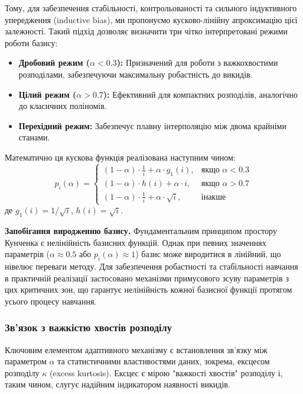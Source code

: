 \documentclass[12pt,a4paper]{article}
\begin{document}
Тому, для забезпечення стабільності, контрольованості та сильного індуктивного упередження (inductive bias), ми пропонуємо кусково-лінійну апроксимацію цієї залежності. Такий підхід дозволяє визначити три чітко інтерпретовані режими роботи базису:
\begin{itemize}
	\item \textbf{Дробовий режим ($\alpha < 0.3$):} Призначений для роботи з важкохвостими розподілами, забезпечуючи максимальну робастність до викидів.
	\item \textbf{Цілий режим ($\alpha > 0.7$):} Ефективний для компактних розподілів, аналогічно до класичних поліномів.
	\item \textbf{Перехідний режим:} Забезпечує плавну інтерполяцію між двома крайніми станами.
\end{itemize}
Математично ця кускова функція реалізована наступним чином:
\begin{equation}
	\label{eq:alpha_kurtosis_mapping}
	p_i(\alpha) = \begin{cases}
		(1-\alpha) \cdot \frac{1}{i} + \alpha \cdot g_1(i), & \text{якщо } \alpha < 0.3 \\
		(1-\alpha) \cdot h(i) + \alpha \cdot i, & \text{якщо } \alpha > 0.7 \\
		(1-\alpha) \cdot \frac{1}{i} + \alpha \cdot \sqrt{i}, & \text{інакше}
	\end{cases}
\end{equation}
де $g_1(i) = 1/\sqrt{i}$, $h(i) = \sqrt{i}$.

\textbf{Запобігання виродженню базису.} Фундаментальним принципом простору Кунченка є нелінійність базисних функцій. Однак при певних значеннях параметрів ($\alpha \approx 0.5$ або $p_i(\alpha) \approx 1$) базис може виродитися в лінійний, що нівелює переваги методу. Для забезпечення робастності та стабільності навчання в практичній реалізації застосовано механізми примусового зсуву параметрів з цих критичних зон, що гарантує нелінійність кожної базисної функції протягом усього процесу навчання.

\subsubsection{Зв'язок з важкістю хвостів розподілу}

Ключовим елементом адаптивного механізму є встановлення зв'язку між параметром $\alpha$ та статистичними властивостями даних, зокрема, ексцесом розподілу $\kappa$ (excess kurtosis). Ексцес є мірою "важкості хвостів" розподілу і, таким чином, слугує надійним індикатором наявності викидів.
\end{document}
